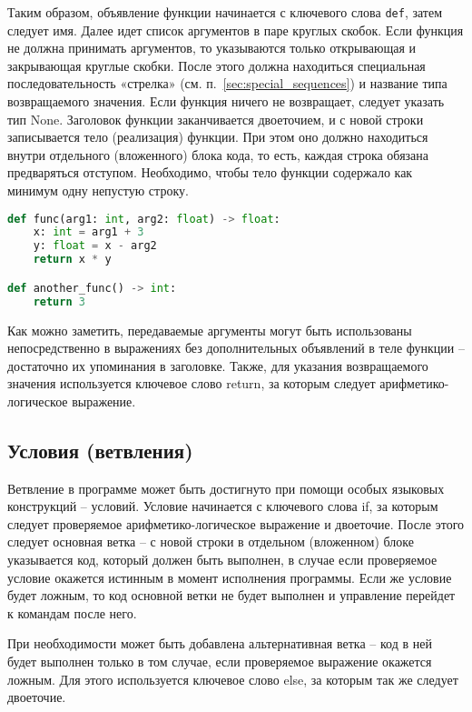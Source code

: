 Таким образом, объявление функции начинается с ключевого слова \verb|def|, затем следует имя.
Далее идет список аргументов в паре круглых скобок.
Если функция не должна принимать аргументов, то указываются только открывающая и закрывающая круглые скобки.
После этого должна находиться специальная последовательность «стрелка» (см. п.~\ref{sec:special_sequences}) и название типа возвращаемого значения.
Если функция ничего не возвращает, следует указать тип None.
Заголовок функции заканчивается двоеточием, и с новой строки записывается тело (реализация) функции.
При этом оно должно находиться внутри отдельного (вложенного) блока кода, то есть, каждая строка обязана предваряться отступом.
Необходимо, чтобы тело функции содержало как минимум одну непустую строку.

\clearpage

\begin{lstlisting}[language=Python, caption=Примеры объявлений функций]
def func(arg1: int, arg2: float) -> float:
    x: int = arg1 + 3
    y: float = x - arg2
    return x * y

def another_func() -> int:
    return 3
\end{lstlisting}

Как можно заметить, передаваемые аргументы могут быть использованы непосредственно в выражениях без дополнительных объявлений в теле функции -- достаточно их упоминания в заголовке.
Также, для указания возвращаемого значения используется ключевое слово return, за которым следует арифметико-логическое выражение.

\subsection{Условия (ветвления)}

Ветвление в программе может быть достигнуто при помощи особых языковых конструкций -- условий.
Условие начинается с ключевого слова if, за которым следует проверяемое арифметико-логическое выражение и двоеточие.
После этого следует основная ветка -- с новой строки в отдельном (вложенном) блоке указывается код, который должен быть выполнен, в случае если проверяемое условие окажется истинным в момент исполнения программы.
Если же условие будет ложным, то код основной ветки не будет выполнен и управление перейдет к командам после него.

При необходимости может быть добавлена альтернативная ветка -- код в ней будет выполнен только в том случае, если проверяемое выражение окажется ложным.
Для этого используется ключевое слово else, за которым так же следует двоеточие.


